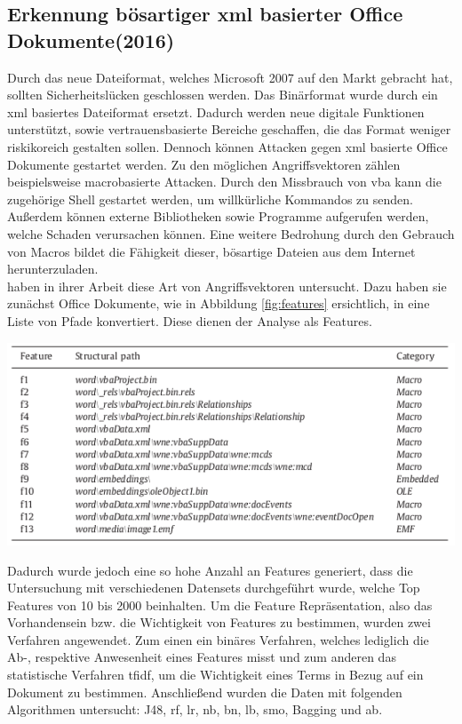 \documentclass[
    12pt, %
    DIV10,
    ngerman, %
    a4paper, %
    oneside, %
    titlepage, %
    parskip=half, %
    headings=normal, %
    listof=totoc, %
    bibliography=totoc, %
    index=totoc, %
    captions=tableheading, %
    final %
]{scrreprt}
\begin{document}
\subsection{Erkennung bösartiger \acs{xml} basierter Office Dokumente(2016)}
Durch das neue Dateiformat, welches Microsoft 2007 auf den Markt gebracht hat, sollten Sicherheitslücken geschlossen werden.
Das Binärformat wurde durch ein	\ac{xml} basiertes Dateiformat ersetzt. Dadurch werden neue digitale Funktionen unterstützt, sowie vertrauensbasierte Bereiche geschaffen, die das Format weniger riskikoreich gestalten sollen. Dennoch können Attacken gegen \ac{xml} basierte Office Dokumente gestartet werden. Zu den möglichen Angriffsvektoren zählen beispielsweise macrobasierte Attacken. Durch den Missbrauch von \ac{vba} kann die zugehörige Shell gestartet werden, um willkürliche Kommandos zu senden. Au{\ss}erdem können externe Bibliotheken sowie Programme aufgerufen werden, welche Schaden verursachen können. Eine weitere Bedrohung durch den Gebrauch von Macros bildet die Fähigkeit dieser, bösartige Dateien aus dem Internet herunterzuladen.\\
\textcite{Cohen2016} haben in ihrer Arbeit diese Art von Angriffsvektoren untersucht. Dazu haben sie zunächst Office Dokumente, wie in Abbildung \ref{fig:features} ersichtlich, in eine Liste von Pfade konvertiert. Diese dienen der Analyse als Features.
\begin{center}
\includegraphics[scale=0.6]{img/pfade.png}
\label{fig:features}
\end{center}
Dadurch wurde jedoch eine so hohe Anzahl an Features generiert, dass die Untersuchung mit verschiedenen Datensets durchgeführt wurde, welche Top Features von 10 bis 2000 beinhalten. Um die Feature Repräsentation, also das Vorhandensein bzw. die Wichtigkeit von Features zu bestimmen, wurden zwei Verfahren angewendet. Zum einen ein binäres Verfahren, welches lediglich die Ab-, respektive Anwesenheit eines Features misst und zum anderen das statistische Verfahren \ac{tfidf}, um die Wichtigkeit eines Terms in Bezug auf ein Dokument zu bestimmen. Anschlie{\ss}end wurden die Daten mit folgenden Algorithmen untersucht: J48, \ac{rf}, \ac{lr}, \ac{nb}, \ac{bn}, \ac{lb}, \ac{smo}, Bagging und \ac{ab}. \\\\
\end{document}
